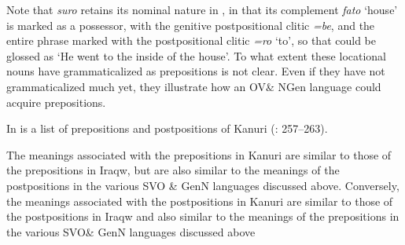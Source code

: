 \documentclass[output=paper]{langsci/langscibook}
\begin{document}
Note that \textit{suro} retains its nominal nature in , in that its complement \textit{fato} ‘house’ is marked as a possessor, with the genitive postpositional clitic \textit{=be}, and the entire phrase marked with the postpositional clitic \textit{=ro} ‘to’, so that  could be glossed as ‘He went to the inside of the house’. To what extent these locational nouns have grammaticalized as prepositions is not clear. Even if they have not grammaticalized much yet, they illustrate how an OV\& NGen language could acquire prepositions.

In  is a list of prepositions and postpositions of Kanuri (\citealt{Hutchinson1981}: 257–263).


\begin{table}
\caption{Prepositions and postpositions of Kanuri }
\label{extab:dryer:35}
\end{table}

The meanings associated with the prepositions in Kanuri are similar to those of the prepositions in Iraqw, but are also similar to the meanings of the postpositions in the various SVO \& GenN languages discussed above. Conversely, the meanings associated with the postpositions in Kanuri are similar to those of the postpositions in Iraqw and also similar to the meanings of the prepositions in the various SVO\& GenN languages discussed above
\end{document}
